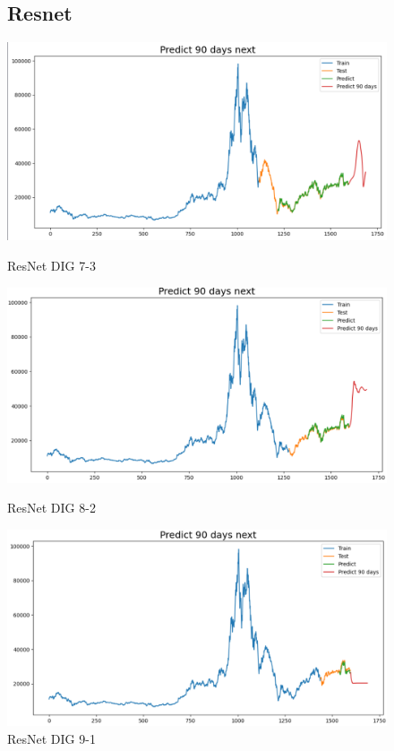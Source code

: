 \documentclass[conference]{IEEEtran}
\begin{document}
\begin{figure}[htbp]
\subsection{Resnet}
\centering
    \begin{minipage}{0.23\textwidth}
    \centering
    \includegraphics[width=1\textwidth]{experiment/resnet/DIG 7_3.png}
    \caption{ResNet DIG 7-3}
    \label{fig:nvl_boxplot}
    \end{minipage}
    \hfill
    \begin{minipage}{0.23\textwidth}
    \centering
    \includegraphics[width=1\textwidth]{experiment/resnet/DIG 8_2.png}
    \caption{ResNet DIG 8-2}
    \label{fig:nvl_histogram}
    \end{minipage}
    \begin{minipage}{0.23\textwidth}
    \centering
    \includegraphics[width=1\textwidth]{experiment/resnet/DIG 9_1.png}
    \caption{ResNet DIG 9-1}
    \label{fig:nvl_histogram}
    \end{minipage}


\end{figure}
\end{document}
